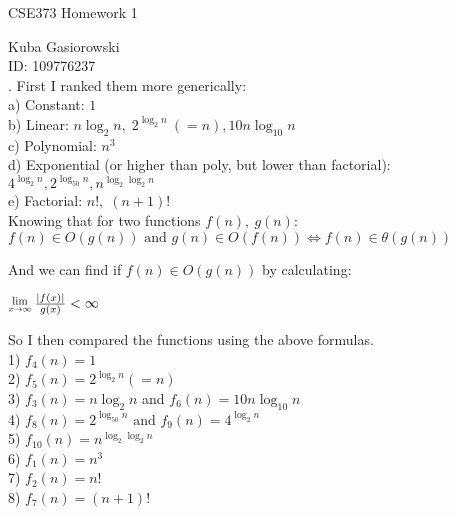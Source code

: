 \documentclass[12pt]{report}
\newcommand{\Lim}[1]{\raisebox{0.5ex}{\scalebox{0.8}{$\displaystyle \lim_{#1}\;$}}}
\newcommand{\no}{\noindent}
\newcommand{\tab}{\hspace*{.6cm}}
\begin{document}
	
	\Large
	\centering
	CSE373 Homework 1
	
	\justify
	\normalsize
	
	Kuba Gasiorowski\\
	ID: 109776237\\
	
	\no 1. First I ranked them more generically:\\
	
	\no\tab a) Constant: $1$\\
	\tab b) Linear: $n\log_2 n, \; 2^{\log_2n}\:(= n), 10n\log_{10}n$\\
	\tab c) Polynomial: $n^3$ \\
	\tab d) Exponential (or higher than poly, but lower than factorial): $4^{\log_2n}, 2^{\log_{50}n}, n^{\log_2\log_2n}$ \\
	\tab e) Factorial: $n!, \; (n+1)!$\\
	
	\no Knowing that for two functions $f(n),\:g(n): $\\
	
	\centering 
	$f(n) \in O(g(n)) \text{ and } g(n) \in O(f(n)) \iff  f(n) \in \theta{}(g(n))$\\
	
	\justify
	
	And we can find if $ f(n) \in O(g(n))$ by calculating: \\ 
	
	\centering
	
	$\Lim{x\rightarrow\infty} \frac{|f(x)|}{g(x)} < \infty$
	
	\justify
	
	So I then compared the functions using the above formulas.\\
	
	\no \tab 1) $f_4(n) = 1$ \\
	\tab 2) $f_5(	n) = 2^{\log_2n} (= n)$ \\
	\tab 3) $f_3(n) = n\log_2n$ and $f_6(n) = 10n\log_{10}n$\\
	\tab 4) $f_8(n) = 2^{\log_{50}n} \text{ and } f_9(n) = 4^{\log_2n}$ \\
	\tab 5) $f_{10}(n) = n^{\log_2\log_2n}$\\
	\tab 6) $f_1(n) = n^3$ \\
	\tab 7) $f_2(n) = n!$ \\
	\tab 8) $f_7(n) = (n+1)!$\\
	
\end{document}
